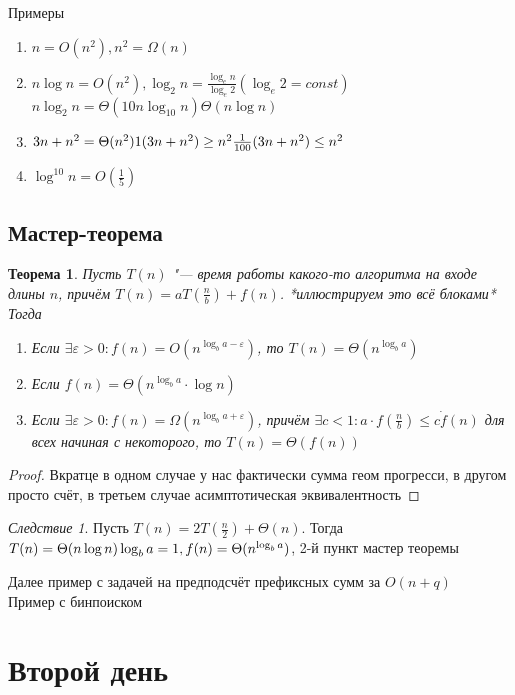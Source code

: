 \documentclass[a4paper, 12pt]{article}
\theoremstyle{plain}
\newtheorem{theorem}{Теорема}[section]
\theoremstyle{definition}
\theoremstyle{remark}
\newtheorem{corollary}{Следствие}[theorem]
\begin{document}
\begin{center}
	Примеры
\end{center}
\begin{enumerate}
	\item $n=O(n^2), n^2=\Omega(n)$
	\item $n\log n = O(n^2), \log_2 n=\frac{\log_e n}{\log_e2}(\log_e2=const)$\\
	$n\log_2n=\Theta(10n\log_{10}n)\Theta(n\log n)$
	\item $3n+n^2=\Theta(n^2)\\
	1(3n+n^2)\geq n^2\\
	\frac{1}{100}(3n+n^2)\leq n^2$
	\item $\log^{10}n=O(\frac{1}{5})$
\end{enumerate}
\subsection{Мастер-теорема}
\begin{theorem}
	Пусть $T(n)$ "--- время работы какого-то алгоритма на входе длины $n$, причём $T(n)=aT(\frac{n}{b})+f(n)$. *иллюстрируем это всё блоками*\\
	Тогда
	\begin{enumerate}
		\item Если $\exists\varepsilon>0: f(n)=O(n^{\log_ba-\varepsilon})$, то $T(n)=\Theta(n^{\log_ba})$
		\item Если $f(n)=\Theta(n^{\log_ba}\cdot\log n)$
		\item Если $\exists\varepsilon>0:f(n)=\Omega(n^{\log_ba+\varepsilon})$, причём  $\exists c<1: a\cdot f(\frac{n}{b})\leq c\dot f(n)$ для всех начиная с некоторого, то $T(n)=\Theta(f(n))$
	\end{enumerate}
\end{theorem}
\begin{proof}
	Вкратце в одном случае у нас фактически сумма геом прогресси, в другом просто счёт, в третьем случае асимптотическая эквивалентность
\end{proof}
\begin{corollary}
	Пусть $T(n)=2T(\frac{n}{2})+\Theta(n)$. Тогда $T(n)=\Theta(n\log n)\\
	\log_ba=1,f(n)=\Theta(n^{\log_ba})$, 2-й пункт мастер теоремы
\end{corollary}
Далее пример с задачей на предподсчёт префиксных сумм за $O(n+q)$\\
Пример с бинпоиском\\
\section{Второй день}
\end{document}
